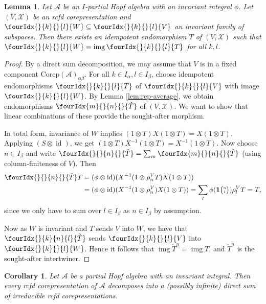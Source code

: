 \documentclass[10pt]{article}
\DeclareMathOperator{\id}{id}
\DeclareMathOperator{\img}{img}
\newcommand{\Corep}{\mathrm{Corep}}
\newcommand{\Grt}[3]{#1{\tiny {\begin{pmatrix} #2\\#3\end{pmatrix}}}}
\newcommand{\UnitC}[2]{\Grt{\mathbf{1}}{#1}{#2}}
\newcommand{\Gr}[5]{\fourIdx{#2}{#4}{#3}{#5}{#1}}%
\newcommand{\Gru}[3]{\Gr{#1}{}{}{#2}{#3}}
\newcommand{\Grd}[3]{\Gr{#1}{#2}{#3}{}{}}
\newtheorem{Lem}[Theorem]{Lemma}
\newtheorem{Cor}[Theorem]{Corollary}
\theoremstyle{definition}
\numberwithin{equation}{section}
\begin{document}
\begin{Lem}
  Let $\mathscr{A}$ be an $I$-partial Hopf algebra with an invariant integral $\phi$.
  Let $(V,\mathscr{X})$ be an rcfd corepresentation
  and $\Gru{W}{k}{l} \subseteq \Gru{V}{k}{l}$ an invariant family of
  subspaces. Then there exists an idempotent endomorphism $T$ of
  $(V,\mathscr{X})$ such that $\Gru{W}{k}{l}=\img\Gru{T}{k}{l}$ for
  all $k,l$.
\end{Lem}
\begin{proof}
By a direct sum decomposition, we may assume that $V$ is in a fixed component $\Corep(\mathscr{A})_{\alpha\beta}$. For all $k\in I_{\alpha},l\in I_{\beta}$, choose idempotent endomorphisms $\Gru{T}{k}{l}$ of $\Gru{V}{k}{l}$
  with image $\Gru{W}{k}{l}$. By Lemma \ref{lem:rep-average}, we obtain
  endomorphisms $\Grd{\check{T}}{m}{n}$ of $(V,\mathscr{X})$. We want to show
  that linear combinations of these provide the sought-after morphism.
  
    In
  total form, invariance of $W$ implies  $(1 \otimes T)X(1
  \otimes T)=X(1\otimes T)$. Applying
 $(S \otimes \id)$, we get   $(1 \otimes T)X^{-1}(1
  \otimes T)=X^{-1}(1\otimes T)$.
Now choose $n\in I_{\beta}$ and write $\Grd{\check{T}}{}{n} = \sum_m \Grd{\check{T}}{m}{n}$ (using column-finiteness of $V$). Then
  \begin{align*}
    \Grd{\check{T}}{}{n} T &= (\phi \otimes \id)(X^{-1}(1 \otimes
    \rho_{n}^{V}T)X(1 \otimes T))  \\ &= 
     (\phi \otimes \id)(X^{-1}(1 \otimes
    \rho_{n}^{V})X(1 \otimes T)) 
    =
  \sum_l \phi(\UnitC{n}{l}) \rho^{V}_{l}T  =T,
  \end{align*}
 since we only have to sum over $l\in I_{\beta}$ as $n\in I_{\beta}$ by assumption. 
 
 Now as $W$ is invariant and $T$ sends $V$ into $W$, we have that $\Gr{\check{T}}{}{n}{k}{l}$ sends $\Gru{V}{k}{l}$ into $\Gru{W}{k}{l}$. Hence it follows that $\img{\check{T}^{n}}=\img T$, and $\check{T}^{n}$ is the sought-after intertwiner.
\end{proof}

\begin{Cor}  \label{cor:rep-cosemisimple}%
  Let $\mathscr{A}$ be a partial Hopf algebra with an invariant integral.  Then
  every rcfd corepresentation of $\mathscr{A}$ decomposes into a (possibly infinite) direct
  sum of irreducible rcfd corepresentations.
\end{Cor} 
\end{document}

